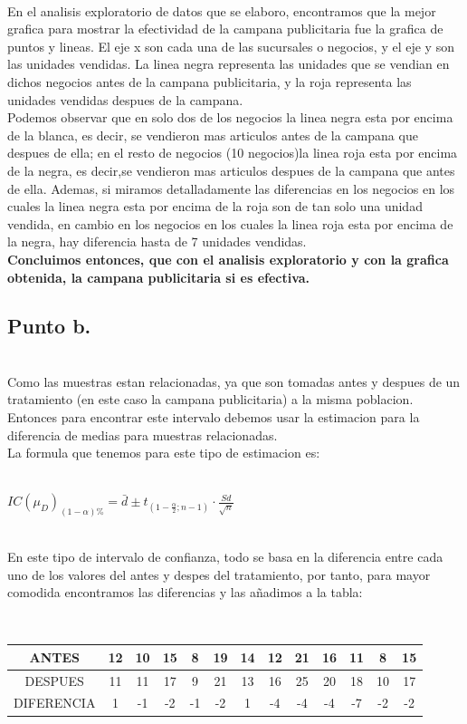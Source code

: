 \documentclass[letterpaper,12pt,onecolumn,titlepage]{article}
\begin{document}
~\\ En el analisis exploratorio de datos que se elaboro, encontramos que la mejor grafica para mostrar la efectividad de la campana publicitaria fue la grafica de puntos y lineas. El eje x son cada una de las sucursales o negocios, y el eje y son las unidades vendidas. La linea negra representa las unidades que se vendian en dichos negocios antes de la campana publicitaria, y la roja representa las unidades vendidas despues de la campana.
~\\ Podemos observar que en solo dos de los negocios la linea negra esta por encima de la blanca, es decir, se vendieron mas articulos antes de la campana que despues de ella; en el resto de negocios (10 negocios)la linea roja esta por encima de la negra, es decir,se vendieron mas articulos despues de la campana que antes de ella. Ademas, si miramos detalladamente las diferencias en los negocios en los cuales la linea negra esta por encima de la roja son de tan solo una unidad vendida, en cambio en los negocios en los cuales la linea roja esta por encima de la negra, hay diferencia hasta de 7 unidades vendidas.
~\\ \textbf{Concluimos entonces, que con el analisis exploratorio y con la grafica obtenida, la campana publicitaria si es efectiva.}

\subsection{Punto b.}
~\\ Como las muestras estan relacionadas, ya que son tomadas antes y despues de un tratamiento (en este caso la campana publicitaria) a la misma poblacion. Entonces para encontrar este intervalo debemos usar la estimacion para la diferencia de medias para muestras relacionadas.
~\\ La formula que tenemos para este tipo de estimacion es:

~\\ $IC(\mu_{D})_{(1-\alpha)\%}=\bar{d} \pm t_{(1-\frac{\alpha}{2};n-1)}\cdot\frac{Sd}{\sqrt{n}}$

~\\ En este tipo de intervalo de confianza, todo se basa en la diferencia entre cada uno de los valores del antes y despes del tratamiento, por tanto, para mayor comodida encontramos las diferencias y las a\~{n}adimos a la tabla:
 
~\\ \begin{center}
 \begin{tabular}{|c|c|c|c|c|c|c|c|c|c|c|c|c|}
\hline 
\rule[-1ex]{0pt}{2.5ex} ANTES & 12 & 10 & 15 & 8 & 19 & 14 & 12 & 21 & 16 & 11 & 8 & 15 \\ 
\hline 
\rule[-1ex]{0pt}{2.5ex} DESPUES & 11 & 11 & 17 & 9 & 21 & 13 & 16 & 25 & 20 & 18 & 10 & 17 \\ 
\hline 
\rule[-1ex]{0pt}{2.5ex} DIFERENCIA & 1 & -1 & -2 & -1 & -2 & 1 & -4 & -4 & -4 & -7 & -2 & -2 \\ 
\hline 
\end{tabular} 
\end{center}
\end{document}
